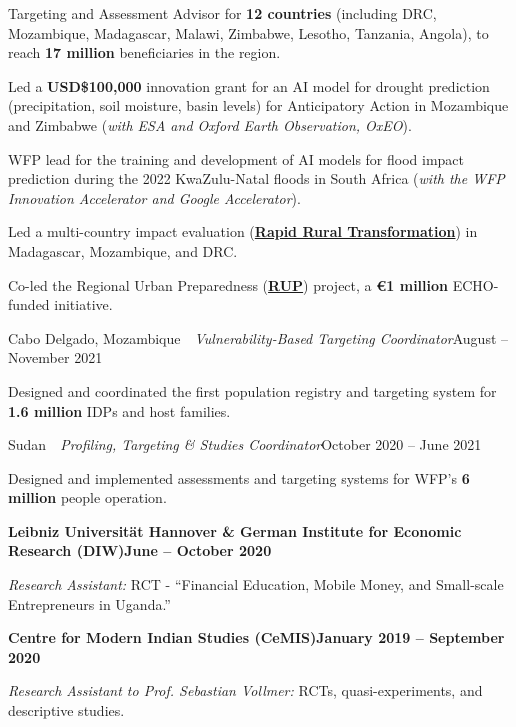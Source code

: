 \documentclass[10pt]{article}
\newcommand{\link}[2]{\href{#1}{\textcolor{cvloc}{\textbf{#2}}}}
\newcommand{\dt}[1]{\textcolor{cvgrey}{#1}}                    %
\newcommand{\orgnamefmt}{\fontsize{11}{13}\selectfont\bfseries} %
\newcommand{\orgline}[2]{{\orgnamefmt #1}\hfill\textbf{\dt{#2}}\par} %
\newcommand{\posline}[2]{#1\hfill\dt{#2}\par}                  %
\newcommand{\gap}{\vspace{6.5pt}}
\newcommand{\pipe}{~\textbar~}
\newcommand{\rolelabel}[1]{\textit{#1}}  %
\newcommand{\roleline}[1]{{\noindent\ignorespaces#1\par}} %
\newcommand{\loc}[1]{\textcolor{cvlink}{#1}} %
\begin{document}
\begin{dashlist}
  \item Targeting and Assessment Advisor for \textbf{12 countries} (including DRC, Mozambique, Madagascar, Malawi, Zimbabwe, Lesotho, Tanzania, Angola), to reach \textbf{17 million} beneficiaries in the region.
  \item Led a \textbf{USD\$100,000} innovation grant for an AI model for drought prediction (precipitation, soil moisture, basin levels) for Anticipatory Action in Mozambique and Zimbabwe (\textit{with ESA and Oxford Earth Observation, OxEO}).
  \item WFP lead for the training and development of AI models for flood impact prediction during the 2022 KwaZulu-Natal floods in South Africa (\textit{with the WFP Innovation Accelerator and Google Accelerator}).
  \item Led a multi-country impact evaluation (\link{https://www.wfp.org/publications/scaling-rapid-rural-transformation-rrt-initiative-madagascar}{Rapid Rural Transformation}) in Madagascar, Mozambique, and DRC.
  \item Co-led the Regional Urban Preparedness (\link{https://www.wfp.org/publications/wfps-regional-urban-preparedness-initiative-response-climate-and-food-security-crises}{RUP}) project, a \textbf{\euro{}1 million} ECHO-funded initiative.
\end{dashlist}
\posline{\loc{Cabo Delgado, Mozambique}\pipe\rolelabel{Vulnerability-Based Targeting Coordinator}}{August -- November 2021}
\begin{dashlist}
  \item Designed and coordinated the first population registry and targeting system for \textbf{1.6 million} IDPs and host families.
\end{dashlist}
\posline{\loc{Sudan}\pipe\rolelabel{Profiling, Targeting \& Studies Coordinator}}{October 2020 -- June 2021}
\begin{dashlist}
  \item Designed and implemented assessments and targeting systems for WFP's \textbf{6 million} people operation.
\end{dashlist}
\gap
\orgline{Leibniz Universität Hannover \& German Institute for Economic Research (DIW)}{June -- October 2020}
\roleline{\rolelabel{Research Assistant:} RCT - ``Financial Education, Mobile Money, and Small-scale Entrepreneurs in Uganda.''}
\gap
\orgline{Centre for Modern Indian Studies (CeMIS)}{January 2019 -- September 2020}
\roleline{\rolelabel{Research Assistant to Prof. Sebastian Vollmer:} RCTs, quasi-experiments, and descriptive studies.}
\end{document}
